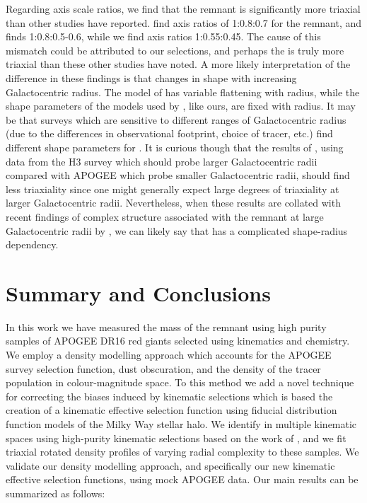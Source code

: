 Regarding axis scale ratios, we find that the \gse remnant is significantly more triaxial than other studies have reported. \textcite{han22} find axis ratios of 1:0.8:0.7 for the \gse remnant, and \textcite{iorio18} finds 1:0.8:0.5-0.6, while we find axis ratios 1:0.55:0.45. The cause of this mismatch could be attributed to our selections, and perhaps the \gse is truly more triaxial than these other studies have noted. A more likely interpretation of the difference in these findings is that \gse changes in shape with increasing Galactocentric radius. The model of \textcite{iorio18} has variable flattening with radius, while the shape parameters of the models used by \textcite{han22}, like ours, are fixed with radius. It may be that surveys which are sensitive to different ranges of Galactocentric radius (due to the differences in observational footprint, choice of tracer, etc.) find different shape parameters for \gse. It is curious though that the results of \textcite{han22}, using data from the H3 survey which should probe larger Galactocentric radii compared with APOGEE which probe smaller Galactocentric radii, should find less triaxiality since one might generally expect large degrees of triaxiality at larger Galactocentric radii. Nevertheless, when these results are collated with recent findings of complex structure associated with the \gse remnant at large Galactocentric radii by \textcite{chandra23}, we can likely say that \gse has a complicated shape-radius dependency.


\section{Summary and Conclusions}
\label{ch3:sec:summary-conclusions}

In this work we have measured the mass of the \gse remnant using high purity samples of APOGEE DR16 red giants selected using kinematics and chemistry. We employ a density modelling approach which accounts for the APOGEE survey selection function, dust obscuration, and the density of the tracer population in colour-magnitude space. To this method we add a novel technique for correcting the biases induced by kinematic selections which is based the creation of a kinematic effective selection function using fiducial distribution function models of the Milky Way stellar halo. We identify \gse in multiple kinematic spaces using high-purity kinematic selections based on the work of \cite{lane22}, and we fit triaxial rotated density profiles of varying radial complexity to these samples. We validate our density modelling approach, and specifically our new kinematic effective selection functions, using mock APOGEE data. Our main results can be summarized as follows:

